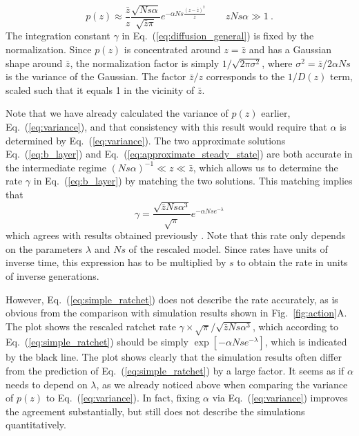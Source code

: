 \documentclass[rmp,preprint]{revtex4}
\newcommand{\EQ}[1]{Eq.~(\ref{eq:#1})}
\newcommand{\FIG}[1]{Fig.~\ref{fig:#1}}
\newcommand{\xz}{z}
\newcommand{\xzs}{\bar{\xz}}
\newcommand{\rate}{\gamma}
\begin{document}
\begin{equation}
\label{eq:approximate_steady_state}
p(\xz) \approx \frac{\xzs}{\xz}\frac{\sqrt{ N s \alpha}}{\sqrt{\xzs \pi }} e^{-\alpha Ns \frac{(\xz-\xzs)^2}{\xzs}} \quad\quad \xz N s \alpha \gg 1 \ .
\end{equation}
The integration constant $\gamma$ in \EQ{diffusion_general} is fixed by the normalization. Since $p(\xz)$ is concentrated around $\xz=\xzs$ and has a Gaussian shape around $\xzs$, the normalization factor is simply $1/\sqrt{2\pi \sigma^2}$, where $\sigma^2 = \xzs/2\alpha Ns$ is the variance of the Gaussian. The factor $\xzs/\xz$ corresponds to the $1/D(\xz)$ term, scaled such that it equals 1 in the vicinity of $\xzs$. 

Note that we have already calculated the variance of $p(\xz)$ earlier, \EQ{variance}, and that consistency with this result would require that $\alpha$ is determined by \EQ{variance}. The two approximate solutions \EQ{b_layer} and \EQ{approximate_steady_state} are both accurate in the intermediate regime $(N s \alpha)^{-1}\ll\xz \ll \xzs$, which allows us to determine the rate $\rate$ in \EQ{b_layer} by matching the two solutions. This matching implies that 
\begin{equation}
\label{eq:simple_ratchet}
\rate = \frac{\sqrt{\xzs Ns \alpha^3}}{\sqrt{\pi}} e^{-\alpha Nse^{-\lambda}}
\end{equation}
which agrees with results obtained previously \citep{Jain:2008p45047}. Note that this rate only depends on the parameters $\lambda$ and $Ns$ of the rescaled model. Since rates have units of inverse time, this expression has to be multiplied by $s$ to obtain the rate in units of inverse generations. 


However, \EQ{simple_ratchet} does not describe the rate accurately, as is obvious from the comparison with simulation results shown in \FIG{action}A. The plot shows the rescaled ratchet rate $\rate \times\sqrt{\pi}/\sqrt{\xzs N s\alpha^3}$, which according to \EQ{simple_ratchet} should be simply $\exp[-\alpha Nse^{-\lambda}]$, which is indicated by the black line.  The plot shows clearly that the simulation results often differ from the prediction of \EQ{simple_ratchet} by a large factor. It seems as if $\alpha$ needs to depend on $\lambda$, as we already noticed above when comparing the variance of $p(\xz)$ to \EQ{variance}. In fact, fixing $\alpha$ via \EQ{variance} improves the agreement substantially, but still does not describe the simulations quantitatively.
\end{document}
